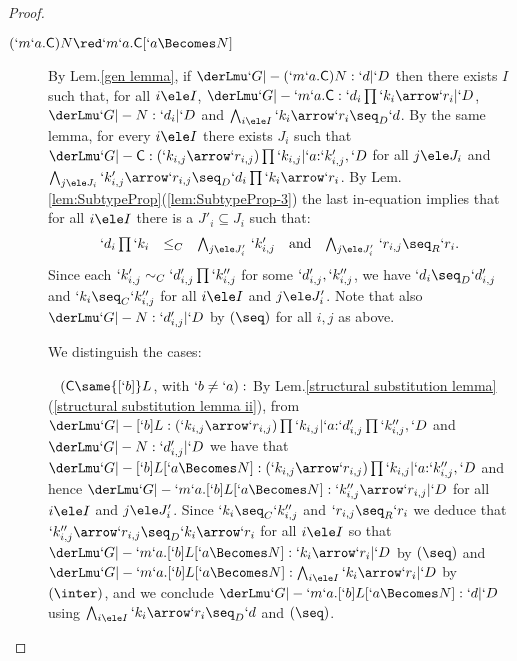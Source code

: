 \documentclass{lmcs}
\begin{document}
\begin{proof}
\begin{description}
 \item [{$ (`m `a . \Cmd ) N \red `m `a . \Cmd [ `a\Becomes N ] $}]
By Lem.\skp\ref{gen lemma}, if $\derLmu `G |- {(`m `a . \Cmd ) N} : `d | `D $ then there exists $I$ such that, for all $i\ele I$, $\derLmu `G |- {`m `a . \Cmd} : `d_i\prod `k_i\arrow `r_i | `D $, $\derLmu `G |- N : `d_i | `D $ and $\bigwedge_{i\ele I} `k_i\arrow `r_i \seq_D `d$. 
By the same lemma, for every $i \ele I$ there exists $J_i$ such that $\derLmu `G |- {\Cmd} : (`k_{i,j}\arrow `r_{i,j})\prod `k_{i,j} | `a{:}`k'_{i,j},`D $ for all $j\ele J_i$ and $\bigwedge_{j\ele J_i} `k'_{i,j}\arrow `r_{i,j} \seq_D `d_i\prod `k_i\arrow `r_i $.
By Lem.\skp\ref{lem:SubtypeProp}\skp(\ref{lem:SubtypeProp-3}) the last in-equation implies that for all $i\ele I$ there is a $J'_i \subseteq J_i$ such that:
 \[ \begin{array}{rcl@{\quad}c@{\quad}rcl}
`d_i\prod `k_i &\leq_C& \bigwedge_{j\ele J'_i}\, `k'_{i,j} 
	& \textrm{and} & 
\bigwedge_{j\ele J'_i}\,`r_{i,j} \seq_R `r_i.
 \end{array} \]
Since each $`k'_{i,j} \sim_C `d'_{i,j}\prod `k''_{i,j}$ for some $`d'_{i,j}, `k''_{i,j}$, we have $`d_i \seq_D `d'_{i,j}$ and $`k_i \seq_C `k''_{i,j}$ for all $i\ele I$ and $j\ele J'_i$. Note that also $\derLmu `G |- N : `d'_{i,j} | `D $ by $(\seq)$ for all $i,j$ as above.
	
We distinguish the cases: 

~\kern-10mm $( \Cmd \same {[`b]}L$, with $`b \neq `a ) : $ 
By Lem.\skp\ref{structural substitution lemma}\skp(\ref{structural substitution lemma ii}),
from $\derLmu `G |- {{[`b]}L} : (`k_{i,j}\arrow `r_{i,j})\prod `k_{i,j} | `a{:} `d'_{i,j}\prod `k''_{i,j},`D $ and 
$\derLmu `G |- N : `d'_{i,j} | `D $ we have that
$\derLmu `G |- {{[`b]}L[`a \Becomes N]} : (`k_{i,j}\arrow `r_{i,j})\prod `k_{i,j} | `a{:} `k''_{i,j},`D $ and
hence $\derLmu `G |- {`m `a. {[`b]}L[`a \Becomes N]} : `k''_{i,j}\arrow `r_{i,j} | `D $ for all $i\ele I$ and $j\ele J'_i$.
Since $`k_i \seq_C `k''_{i,j}$ and $`r_{i,j} \seq_R `r_i$ we deduce that $`k''_{i,j}\arrow `r_{i,j} \seq_D `k_i\arrow `r_i$
for all $i\ele I$ so that $\derLmu `G |- {`m `a. {[`b]}L[`a \Becomes N]} : `k_i\arrow `r_i | `D $ by $(\seq)$
and $\derLmu `G |- {`m `a. {[`b]}L[`a \Becomes N]} : \bigwedge_{i\ele I}`k_i\arrow `r_i | `D $ by $(\inter)$,
and we conclude $\derLmu `G |- {`m `a. {[`b]}L[`a \Becomes N]} : `d | `D $ using 
$\bigwedge_{i\ele I} `k_i\arrow `r_i \seq_D `d$ and $(\seq)$.


\end{description}
\end{proof}
\end{document}
